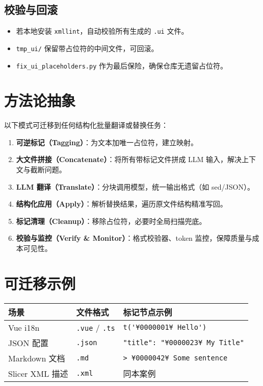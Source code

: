\documentclass[12pt]{article}
\begin{document}
\subsection{校验与回滚}
\begin{itemize}
  \item 若本地安装 \texttt{xmllint}，自动校验所有生成的 \texttt{.ui} 文件。
  \item \texttt{tmp\_ui/} 保留带占位符的中间文件，可回滚。
  \item \texttt{fix\_ui\_placeholders.py} 作为最后保险，确保仓库无遗留占位符。
\end{itemize}

\section{方法论抽象}

以下模式可迁移到任何结构化批量翻译或替换任务：
\begin{enumerate}
  \item \textbf{可逆标记（Tagging）}：为文本加唯一占位符，建立映射。
  \item \textbf{大文件拼接（Concatenate）}：将所有带标记文件拼成 LLM 输入，解决上下文与截断问题。
  \item \textbf{LLM 翻译（Translate）}：分块调用模型，统一输出格式（如 sed/JSON）。
  \item \textbf{结构化应用（Apply）}：解析替换结果，遍历原文件结构精准写回。
  \item \textbf{标记清理（Cleanup）}：移除占位符，必要时全局扫描兜底。
  \item \textbf{校验与监控（Verify \& Monitor）}：格式校验器、token 监控，保障质量与成本可见性。
\end{enumerate}

\section{可迁移示例}

\begin{longtable}{p{3cm} p{4cm} p{7cm}}
\hline
场景 & 文件格式 & 标记节点示例 \\
\hline
Vue i18n & \texttt{.vue} / \texttt{.ts} & \verb|t('¥0000001¥ Hello')| \\
JSON 配置 & \texttt{.json} & \verb|"title": "¥0000023¥ My Title"| \\
Markdown 文档 & \texttt{.md} & \verb|> ¥0000042¥ Some sentence| \\
Slicer XML 描述 & \texttt{.xml} & 同本案例 \\
\hline
\end{longtable}
\end{document}
